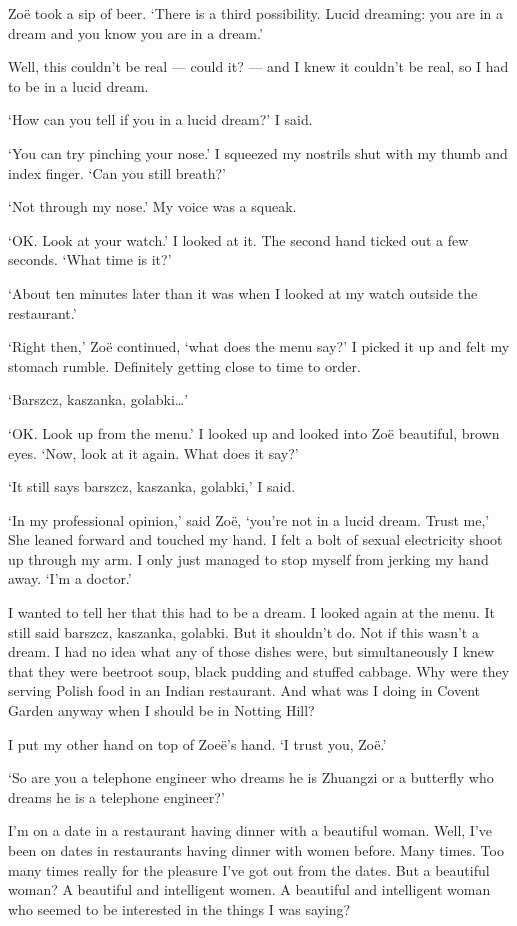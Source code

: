 Zo{\"e} took a sip of beer. `There is a third
possibility. Lucid dreaming: you are in a dream and you know you are
in a dream.'

Well, this couldn't be real --- could it? --- and I knew it couldn't be real, so I had
to be in a lucid dream.

`How can you tell if you in a lucid dream?' I said.

`You can try pinching your nose.' I squeezed my nostrils shut with
my thumb and index finger. `Can you still breath?'

`Not through my nose.' My voice was a squeak.

`OK. Look at your watch.' I looked at it. The second hand ticked out a few seconds. `What time is it?'

`About ten minutes later than it was when I looked at my watch
outside the restaurant.'

`Right then,' Zo{\"e} continued, `what does the menu say?' I picked it
up and felt my stomach rumble. Definitely getting close to time to order.

`Barszcz, kaszanka, golabki\dots'

`OK. Look up from the menu.' I looked up and looked into Zo{\"e} beautiful, brown
eyes. `Now, look at it again. What does it say?'

`It still says barszcz, kaszanka, golabki,' I said.

`In my professional opinion,' said Zo{\"e}, `you're not in a lucid
dream. Trust me,' She leaned forward and touched my hand. I felt a
bolt of sexual electricity shoot up through my arm. I only just
managed to stop myself from jerking my hand away. `I'm a doctor.'

I wanted to tell her that this had to be a dream. I looked again at
the menu. It still said barszcz, kaszanka, golabki. But it shouldn't
do. Not if this wasn't a dream. I had no idea what any of those
dishes were, but simultaneously I knew that they were beetroot soup,
black pudding and stuffed cabbage. Why were they serving Polish food
in an Indian restaurant. And what was I doing in Covent Garden
anyway when I should be in Notting Hill?

I put my other hand on top of Zoe{\"e}'s hand. `I trust you, Zo{\"e}.'

`So are you a telephone engineer who dreams he is Zhuangzi or a
butterfly who dreams he is a telephone engineer?'

I'm on a date in a restaurant having dinner with a beautiful woman.
Well, I've been on dates in restaurants having dinner with women
before. Many times. Too many times really for the pleasure
I've got out from the dates. But a {\twelveit beautiful\/} woman? A
beautiful and intelligent women. A beautiful and intelligent woman
who seemed to be interested in the things I was saying?

